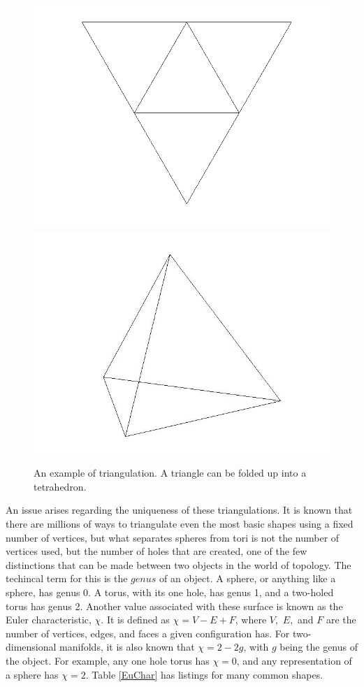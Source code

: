 \documentclass[12pt]{article}
\begin{document}
  
\begin{figure}
\includegraphics[scale = 0.5]{flattetrahedron.png}
\includegraphics[scale = 0.3]{tetrahedron.jpg}
\caption{An example of triangulation. A triangle can be folded up into a tetrahedron.}
\end{figure}

\noindent An issue arises regarding the uniqueness of these triangulations. It is known that there are millions of ways to triangulate even the most basic shapes using a fixed number of vertices, but what separates spheres from tori is not the number of vertices used, but the number of holes that are created, one of the few distinctions that can be made between two objects in the world of topology. The techincal term for this is the $genus$ of an object. A sphere, or anything like a sphere, has genus 0. A torus, with its one hole, has genus 1, and a two-holed torus has genus 2. Another value associated with these surface is known as the Euler characteristic, $\chi$. It is defined as $\displaystyle\chi = V - E + F$, where $V,$ $E,$ and $F$ are the number of vertices, edges, and faces a given configuration has. For two-dimensional manifolds, it is also known that $\displaystyle\chi = 2 - 2g$, with $g$ being the genus of the object. For example, any one hole torus has $\chi = 0$, and any representation of a sphere has $\chi = 2.$ Table \ref{EuChar} has listings for many common shapes. \newline
\end{document}
